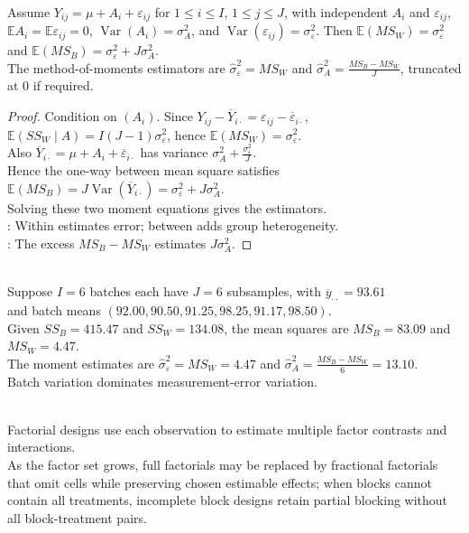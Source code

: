 \begin{proposition} \label{prop:random-effects-one-way-expected-mean-squares} \\
Assume $Y_{ij}=\mu+A_i+\varepsilon_{ij}$ for $1\leq i\leq I$, $1\leq j\leq J$, with independent $A_i$ and $\varepsilon_{ij}$, $\mathbb{E}A_i=\mathbb{E}\varepsilon_{ij}=0$, $\operatorname{Var}(A_i)=\sigma_A^2$, and $\operatorname{Var}(\varepsilon_{ij})=\sigma_\varepsilon^2$. Then $\mathbb{E}(MS_W)=\sigma_\varepsilon^2$ and $\mathbb{E}(MS_B)=\sigma_\varepsilon^2+J\sigma_A^2$.\\
The method-of-moments estimators are $\widehat{\sigma}_\varepsilon^2=MS_W$ and $\widehat{\sigma}_A^2=\frac{MS_B-MS_W}{J}$, truncated at $0$ if required.
\begin{proof} Condition on $(A_i)$. Since $Y_{ij}-\overline{Y}_{i\cdot}=\varepsilon_{ij}-\overline{\varepsilon}_{i\cdot}$, $\mathbb{E}(SS_W\mid A)=I(J-1)\sigma_\varepsilon^2$, hence $\mathbb{E}(MS_W)=\sigma_\varepsilon^2$.\\
Also $\overline{Y}_{i\cdot}=\mu+A_i+\overline{\varepsilon}_{i\cdot}$ has variance $\sigma_A^2+\frac{\sigma_\varepsilon^2}{J}$.\\
Hence the one-way between mean square satisfies $\mathbb{E}(MS_B)=J\operatorname{Var}(\overline{Y}_{i\cdot})=\sigma_\varepsilon^2+J\sigma_A^2$.\\
Solving these two moment equations gives the estimators.\\
: Within estimates error; between adds group heterogeneity.\\
: The excess $MS_B-MS_W$ estimates $J\sigma_A^2$.
\end{proof}
\end{proposition}

\begin{example} \label{ex:dye-batch-random-effects-estimates} \\
Suppose $I=6$ batches each have $J=6$ subsamples, with $\overline{y}_{\cdot\cdot}=93.61$\\
and batch means $(92.00,90.50,91.25,98.25,91.17,98.50)$.\\
Given $SS_B=415.47$ and $SS_W=134.08$, the mean squares are $MS_B=83.09$ and $MS_W=4.47$.\\
The moment estimates are $\widehat{\sigma}_\varepsilon^2=MS_W=4.47$ and $\widehat{\sigma}_A^2=\frac{MS_B-MS_W}{6}=13.10$.\\
Batch variation dominates measurement-error variation.
\end{example}

\begin{remark} \label{rem:factorial-fractional-and-incomplete-designs} \\
Factorial designs use each observation to estimate multiple factor contrasts and interactions.\\
As the factor set grows, full factorials may be replaced by fractional factorials that omit cells while preserving chosen estimable effects; when blocks cannot contain all treatments, incomplete block designs retain partial blocking without all block-treatment pairs.
\end{remark}
